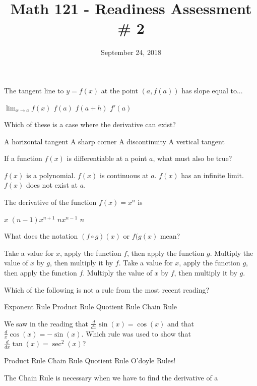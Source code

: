 \documentclass{exam}
\title{Math 121 - Readiness Assessment \# 2}
\date{September 24, 2018}
\begin{document}
\maketitle

\begin{questions}
\question The tangent line to $y = f(x)$ at the point $(a, f(a))$ has slope equal to...
\begin{choices}
\choice $\lim_{x\rightarrow a} f(x)$
\choice $f(a)$
\choice $f(a+h)$
\choice $f'(a)$
\end{choices}
\question Which of these is a case where the derivative can exist?
\begin{choices}
\choice A horizontal tangent
\choice A sharp corner
\choice A discontinuity
\choice A vertical tangent
\end{choices}
\question If a function $f(x)$ is differentiable at a point $a$, what must also be true?
\begin{choices}
\choice $f(x)$ is a polynomial.
\choice $f(x)$ is continuous at $a$.
\choice $f(x)$ has an infinite limit.
\choice $f(x)$ does not exist at $a$.
\end{choices}
\question The derivative of the function $f(x) = x^n$ is
\begin{choices}
\choice $x$
\choice $(n-1)x^{n+1}$
\choice $nx^{n-1}$
\choice $n$
\end{choices}
\question What does the notation $(f \circ g)(x)$ or $f(g(x)$ mean?
\begin{choices}
\choice Take a value for $x$, apply the function $f$, then apply the function $g$.
\choice Multiply the value of $x$ by $g$, then multiply it by $f$.
\choice Take a value for $x$, apply the function $g$, then apply the function $f$.
\choice Multiply the value of $x$ by $f$, then multiply it by $g$.
\end{choices}
\question Which of the following is not a rule from the most recent reading? 
\begin{choices}
\choice Exponent Rule
\choice Product Rule
\choice Quotient Rule
\choice Chain Rule
\end{choices}
\question We saw in the reading that $\frac{d}{dx} \sin(x) = \cos(x)$ and that $\frac{d}{x} \cos(x) = -\sin(x)$. Which rule was used to show that $\frac{d}{dx} \tan(x) = \sec^2(x)$?
\begin{choices}
\choice Product Rule
\choice Chain Rule
\choice Quotient Rule
\choice O'doyle Rules!
\end{choices}
\question The Chain Rule is necessary when we have to find the derivative of a

\end{questions}
\end{document}
